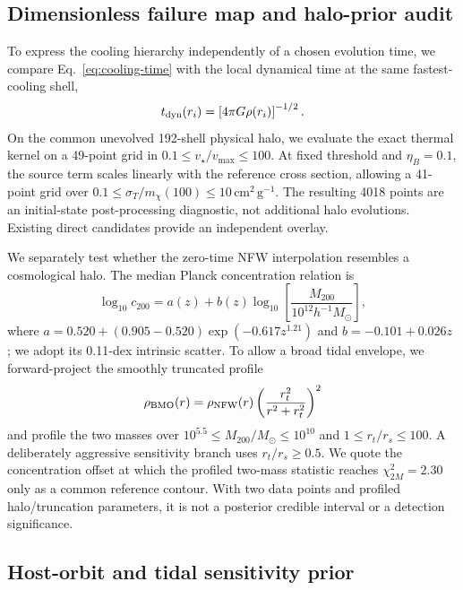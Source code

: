\documentclass[12pt]{article}
\newcommand{\Msun}{M_\odot}
\newcommand{\sigmavm}{\sigma_T/m_\chi}
\newcommand{\vstar}{v_\star}
\newcommand{\tdyn}{t_{\rm dyn}}
\begin{document}
\subsection{Dimensionless failure map and halo-prior audit}

To express the cooling hierarchy independently of a chosen evolution time,
we compare Eq.~\eqref{eq:cooling-time} with the local dynamical time at the
same fastest-cooling shell,
\begin{equation}
  \tdyn(r_i)=\left[4\pi G\rho(r_i)\right]^{-1/2}.
  \label{eq:dynamical-time}
\end{equation}
On the common unevolved 192-shell physical halo, we evaluate the exact thermal
kernel on a 49-point grid in $0.1\leq\vstar/v_{\max}\leq100$.  At fixed
threshold and $\eta_B=0.1$, the source term scales linearly with the reference
cross section, allowing a 41-point grid over
$0.1\leq\sigmavm(100)\leq10\,\mathrm{cm^2\,g^{-1}}$.  The resulting 4018
points are an initial-state post-processing diagnostic, not additional halo
evolutions.  Existing direct candidates provide an independent overlay.

We separately test whether the zero-time NFW interpolation resembles a
cosmological halo.  The median Planck concentration relation is
\begin{equation}
 \log_{10}c_{200}=a(z)+b(z)\log_{10}\!\left[
 \frac{M_{200}}{10^{12}h^{-1}\Msun}\right],
 \label{eq:concentration-relation}
\end{equation}
where $a=0.520+(0.905-0.520)\exp(-0.617z^{1.21})$ and
$b=-0.101+0.026z$ \citep{DuttonMaccio2014}; we adopt its 0.11-dex intrinsic
scatter.  To allow a broad tidal envelope, we forward-project the smoothly
truncated profile
\begin{equation}
 \rho_{\rm BMO}(r)=\rho_{\rm NFW}(r)
 \left(\frac{r_t^2}{r^2+r_t^2}\right)^2
 \label{eq:bmo-profile}
\end{equation}
\citep{Baltz2009} and profile the two masses over
$10^{5.5}\leq M_{200}/\Msun\leq10^{10}$ and
$1\leq r_t/r_s\leq100$.  A deliberately aggressive sensitivity branch uses
$r_t/r_s\geq0.5$.  We quote the concentration offset at which the profiled
two-mass statistic reaches $\chi^2_{2M}=2.30$ only as a common reference
contour.  With two data points and profiled halo/truncation parameters, it is
not a posterior credible interval or a detection significance.

\subsection{Host-orbit and tidal sensitivity prior}
\label{sec:host-orbit-method}
\end{document}
